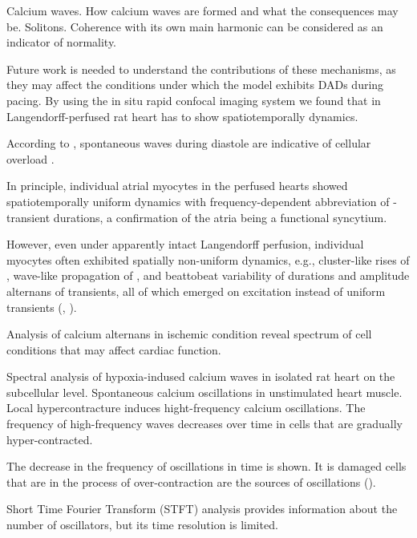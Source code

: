 \documentclass{biophys-new}
\begin{document}
Calcium waves.
How calcium waves are formed and what the consequences may be.
Solitons.
Coherence with its own main harmonic can be considered as an indicator of normality.


Future work is needed to understand the contributions of these mechanisms, as they may affect the conditions under which the model exhibits DADs during pacing.
By using the in situ rapid confocal imaging system
we found that in Langendorff-perfused rat heart has to show
spatiotemporally  dynamics.

According to \cite{macquaide2007measurement}, spontaneous  waves during diastole are indicative of cellular  overload .

In principle, individual atrial myocytes in the perfused hearts showed spatiotemporally uniform  dynamics with frequency-dependent abbreviation of -transient durations,
a confirmation of the atria being a functional syncytium.

However, even under apparently intact Langendorff perfusion,
individual myocytes often exhibited spatially non-uniform  dynamics,
e.g., cluster-like rises of , wave-like propagation of ,
and beattobeat variability of durations and amplitude alternans of  transients, all of which emerged on excitation instead of uniform  transients (\cite{jiang2014pacing}, \cite{aguirre2014intravital}).


Analysis of calcium alternans in ischemic condition reveal spectrum of cell conditions that may affect cardiac function.

Spectral analysis of hypoxia-indused calcium waves in isolated rat heart on the subcellular level.
Spontaneous calcium oscillations in unstimulated heart muscle.
Local hypercontracture induces hight-frequency calcium oscillations.
The frequency of high-frequency waves decreases over time in cells that are gradually hyper-contracted.

The decrease in the frequency of oscillations in time is shown.
It is damaged cells that are in the process of over-contraction
are the sources of oscillations (\cite{sato2014depolarization}).

Short Time Fourier Transform (STFT) analysis provides information about the number of oscillators, but its time resolution is limited.
\end{document}

